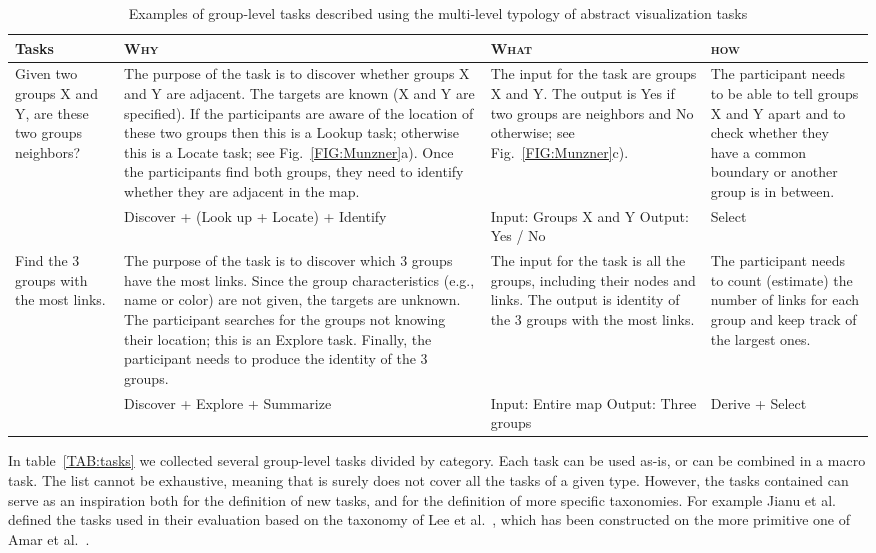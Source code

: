 \documentclass{article}
\begin{document}
\begin{table}[p]
   \small
   \setlength{\tabulinesep}{7pt}
   \begin{tabu}{X[0.4]X[0.95]X[0.5]X[0.4]}
     \toprule  
     Tasks & \textsc{Why} & \textsc{What} & \textsc{how} \\
     \midrule
     Given two groups X and Y, are these two groups neighbors? & The purpose of the task is to discover whether groups X and Y are adjacent. The targets are known (X and Y are specified). If the participants are aware of the location of these two groups then this is a Lookup task; otherwise this is a Locate task; see Fig.~\ref{FIG:Munzner}a). 
     Once the participants find both groups, they need to identify whether they are adjacent in the map.
     & The input for the task are groups X and Y. The output is Yes if two groups are neighbors and No otherwise; see Fig.~\ref{FIG:Munzner}c).
     & The participant needs to be able to tell groups X and Y apart and to check whether they have a common boundary or another group is in between.  \\
     & Discover + (Look up + Locate) + Identify &
     Input: Groups X and Y \newline Output: Yes / No &
     Select \\
     \midrule
      
     Find the 3 groups with the most links. & The purpose of the task is to discover which 3 groups have the most links. Since the group characteristics (e.g., name or color) are not given, the targets are unknown. The participant searches for the groups not knowing their location; this is an Explore task. Finally, the participant needs to produce the identity of the 3 groups. 
     & The input for the task is all the groups, including their nodes and links. The output is identity of the 3 groups with the most links.   
     & The participant needs to count (estimate) the number of links for each group and keep track of the largest ones. \\
     & Discover + Explore + Summarize &
     Input: Entire map \newline Output: Three groups &
     Derive + Select \\
     \bottomrule
  \end{tabu}
\caption{Examples of group-level tasks described using the multi-level typology of abstract visualization tasks} \label{TAB:link}
\end{table}

In table~\ref{TAB:tasks} we collected several group-level tasks divided by category. Each task can be used as-is, or can be combined in a macro task. The list cannot be exhaustive, meaning that is surely does not cover all the tasks of a given type. However, the tasks contained can serve as an inspiration both for the definition of new tasks, and for the definition of more specific taxonomies. For example Jianu et al.~\cite{IV_Radu} defined the tasks used in their evaluation based on the taxonomy of Lee et al.~\cite{IV_BL}, which has been constructed on the more primitive one of Amar et al.~\cite{IV_RA1}.
\end{document}
